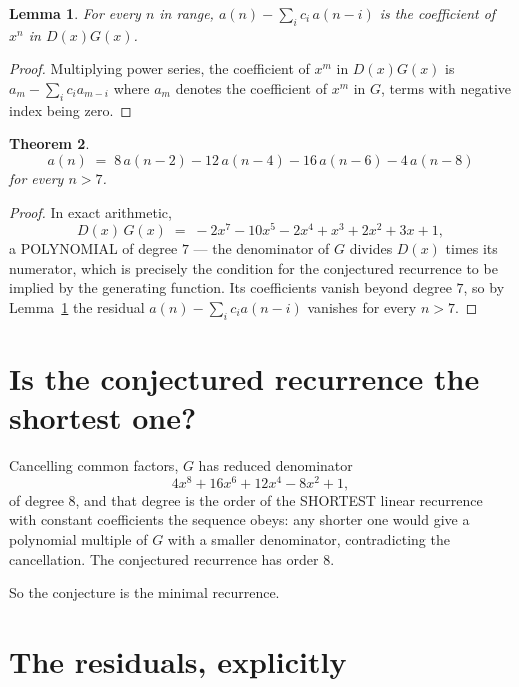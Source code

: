 \documentclass[11pt,a4paper]{article}
\theoremstyle{plain}
\newtheorem{theorem}{Theorem}
\newtheorem{lemma}[theorem]{Lemma}
\theoremstyle{definition}
\begin{document}
\begin{lemma}\label{lem:key}
For every $n$ in range, $a(n)-\sum_i c_i\,a(n-i)$ is the coefficient of $x^{n}$ in
$D(x)G(x)$.
\end{lemma}

\begin{proof}
Multiplying power series, the coefficient of $x^{m}$ in $D(x)G(x)$ is
$a_m-\sum_i c_i a_{m-i}$ where $a_m$ denotes the coefficient of $x^{m}$ in $G$, terms with
negative index being zero.
\end{proof}

\begin{theorem}
\[
a(n)\;=\;8\,a(n-2) - 12\,a(n-4) - 16\,a(n-6) - 4\,a(n-8)
\]
for every $n>7$.
\end{theorem}

\begin{proof}
In exact arithmetic,
\[
D(x)\,G(x)\;=\;- 2 x^{7} - 10 x^{5} - 2 x^{4} + x^{3} + 2 x^{2} + 3 x + 1,
\]
a POLYNOMIAL of degree $7$ --- the denominator of $G$ divides $D(x)$ times its numerator,
which is precisely the condition for the conjectured recurrence to be implied by the
generating function. Its coefficients vanish beyond degree $7$, so by
Lemma~\ref{lem:key} the residual $a(n)-\sum_ic_ia(n-i)$ vanishes for every
$n>7$.
\end{proof}

\section{Is the conjectured recurrence the shortest one?}

Cancelling common factors, $G$ has reduced denominator
\[
4 x^{8} + 16 x^{6} + 12 x^{4} - 8 x^{2} + 1,
\]
of degree $8$, and that degree is the order of the SHORTEST linear recurrence with
constant coefficients the sequence obeys: any shorter one would give a polynomial multiple of
$G$ with a smaller denominator, contradicting the cancellation. The conjectured recurrence has
order $8$.

So the conjecture is the minimal recurrence.

\section{The residuals, explicitly}
\end{document}
